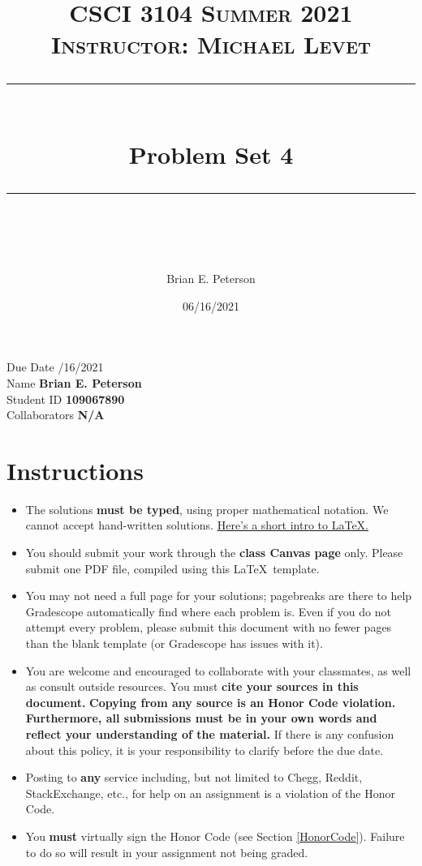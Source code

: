 \documentclass[11pt]{article}
\title{
\normalfont \normalsize 
\textsc{CSCI 3104 Summer 2021 \\ 
Instructor: Michael Levet} \\
[10pt] 
\rule{\linewidth}{0.5pt} \\[6pt] 
\huge Problem Set 4 \\
\rule{\linewidth}{2pt}  \\[10pt]
}
\author{Brian E. Peterson}
\date{06/16/2021}
\theoremstyle{definition}
\theoremstyle{definition}
\theoremstyle{definition}
\begin{document}
\maketitle


\noindent
Due Date /16/2021 \\
Name \dotfill \textbf{Brian E. Peterson} \\
Student ID \dotfill \textbf{109067890} \\
Collaborators \dotfill \textbf{N/A}

\tableofcontents

\section{Instructions}
 \begin{itemize}
	\item The solutions \textbf{must be typed}, using proper mathematical notation. We cannot accept hand-written solutions. \href{http://ece.uprm.edu/~caceros/latex/introduction.pdf}{Here's a short intro to \LaTeX.}
	\item You should submit your work through the \textbf{class Canvas page} only. Please submit one PDF file, compiled using this \LaTeX \ template.
	\item You may not need a full page for your solutions; pagebreaks are there to help Gradescope automatically find where each problem is. Even if you do not attempt every problem, please submit this document with no fewer pages than the blank template (or Gradescope has issues with it).

	\item You are welcome and encouraged to collaborate with your classmates, as well as consult outside resources. You must \textbf{cite your sources in this document.} \textbf{Copying from any source is an Honor Code violation. Furthermore, all submissions must be in your own words and reflect your understanding of the material.} If there is any confusion about this policy, it is your responsibility to clarify before the due date. 

	\item Posting to \textbf{any} service including, but not limited to Chegg, Reddit, StackExchange, etc., for help on an assignment is a violation of the Honor Code.

	\item You \textbf{must} virtually sign the Honor Code (see Section \ref{HonorCode}). Failure to do so will result in your assignment not being graded.
\end{itemize}
\end{document}
